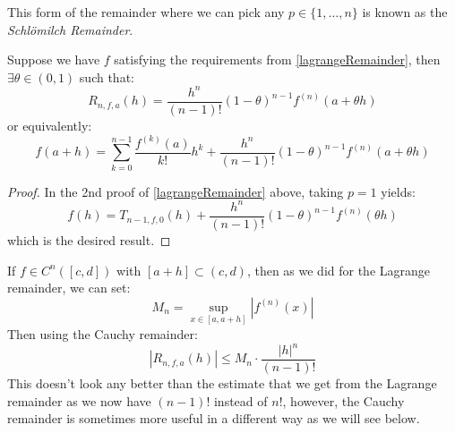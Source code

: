 \documentclass[../main.tex]{subfiles}
\begin{document}
\begin{remark}
  This form of the remainder where we can pick any $p \in \{1, \ldots, n\}$ is known as the \textit{Schl\"omilch Remainder}.
\end{remark}
\begin{theorem}
  Suppose we have $f$ satisfying the requirements from \cref{lagrangeRemainder}, then $\exists \theta \in (0, 1)$ such that:
  \label{cauchyRemainder}
  \[
    R_{n, f, a}(h) =  \frac{h^n}{(n - 1)!} (1 - \theta)^{n - 1}f^{(n)}(a + \theta h)
  \]
  or equivalently:
  \[
    f(a + h) = \sum_{k = 0}^{n - 1} \frac{f^{(k)}(a)}{k!}h^{k} + \frac{h^n}{(n - 1)!} (1 - \theta)^{n - 1}f^{(n)}(a + \theta h)
  \]
\end{theorem}
\begin{proof}
  In the 2nd proof of \cref{lagrangeRemainder} above, taking $p = 1$ yields:
  \[
    f(h) = T_{n - 1, f, 0}(h) + \frac{h^{n}}{(n - 1)!}(1 - \theta)^{n - 1}f^{(n)}(\theta h)
  \]
  which is the desired result.
\end{proof}
\begin{remark}
  If $f \in C^{n}([c, d])$ with $[a + h] \subset (c, d)$, then as we did for the Lagrange remainder, we can set:
  \[
    M_{n} = \sup_{x \in [a, a + h]} |f^{(n)}(x)|
  \]
  Then using the Cauchy remainder:
  \[
    |R_{n, f, a}(h)| \leq M_n \cdot \frac{|h|^{n}}{(n - 1)!}
  \]
  This doesn't look any better than the estimate that we get from the Lagrange remainder as we now have $(n - 1)!$ instead of $n!$, however, the Cauchy remainder is sometimes more useful in a different way as we will see below.
\end{remark}
\end{document}
